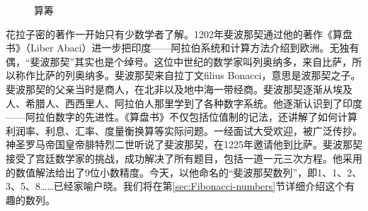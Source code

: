 \documentclass[b5paper]{ctexart}
\begin{document}
\begin{figure}[htbp]
 \centering
 \caption{算筹}
\end{figure}

花拉子密的著作一开始只有少数学者了解。1202年斐波那契通过他的著作《算盘书》（Liber Abaci）进一步把印度——阿拉伯系统和计算方法介绍到欧洲。无独有偶，“斐波那契”其实也是个绰号。这位中世纪的数学家叫列奥纳多，来自比萨，所以称作比萨的列奥纳多。斐波那契来自拉丁文filius Bonacci，意思是波那契之子。斐波那契的父亲当时是商人，在北非以及地中海一带经商。斐波那契逐渐从埃及人、希腊人、西西里人、阿拉伯人那里学到了各种数字系统。他逐渐认识到了印度——阿拉伯数字的先进性。《算盘书》不仅包括位值制的记法，还讲解了如何计算利润率、利息、汇率、度量衡换算等实际问题。一经面试大受欢迎，被广泛传抄。神圣罗马帝国皇帝腓特烈二世听说了斐波那契，在1225年邀请他到比萨。斐波那契接受了宫廷数学家的挑战，成功解决了所有题目，包括一道一元三次方程。他采用的数值解法给出了9位小数精度\cite{Gies-Carney-24}。今天，以他命名的“斐波那契数列”，即1、1、2、3、5、8……已经家喻户晓。我们将在第\ref{sec:Fibonacci-numbers}节详细介绍这个有趣的数列。
\end{document}
